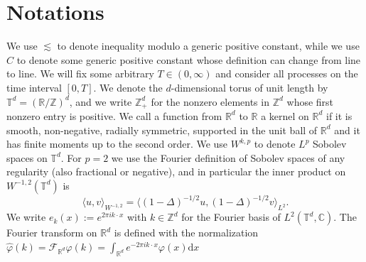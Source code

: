 \chapter{Notations}\label{sec:notations}

We use $\lesssim$ to denote inequality modulo a generic positive constant, while we use $C$ to denote some generic positive constant whose definition can change from line to line. We will fix some arbitrary $T\in (0,\infty)$ and consider all processes on the time interval $[0,T]$. We denote the $d$-dimensional  torus of unit length by $\mathbb{T}^d = (\mathbb{R}/\mathbb{Z})^d$, and we write $\mathbb{Z}^d_{+}$ for the nonzero elements in $\mathbb{Z}^d$ whose first nonzero entry is positive. We call a function from $\mathbb R^d$ to $\mathbb R$ a kernel on $\mathbb{R}^d$ if it is smooth, non-negative, radially symmetric, supported in the unit ball of $\mathbb{R}^d$ and it has finite moments up to the second order. We use $W^{k,p}$ to denote $L^p$ Sobolev spaces on $\mathbb T^d$. For $p=2$ we use the Fourier definition of Sobolev spaces of any regularity (also fractional or negative), and in particular the inner product on $W^{-1,2}(\mathbb{T}^d)$ is
\begin{equation}\label{eq:inner-prod-H-1}
    \langle u,v \rangle_{W^{-1,2}} = \langle (1-\Delta)^{-1/2}u, (1-\Delta)^{-1/2}v\rangle_{L^2}.
\end{equation}
We write $e_k(x) := e^{2\pi i k \cdot x}$ with $k \in \mathbb{Z}^d$ for the Fourier basis of $L^2(\mathbb{T}^d,\mathbb{C})$. The Fourier transform on $\mathbb R^d$ is defined with the normalization $\hat \varphi (k) = \mathcal{F}_{\mathbb R^d}\varphi(k) = \int_{\mathbb R^d} e^{-2\pi i k \cdot x} \varphi(x) \mathrm{d} x$\\ 


